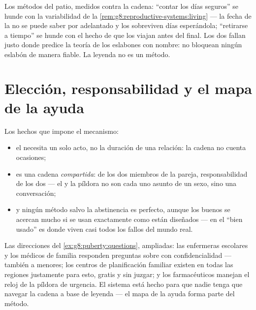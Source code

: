 \begin{remark}\label{rem:g8:contraception:notwork}
Los métodos del patio, medidos contra la cadena: ``contar los días
seguros'' se hunde con la variabilidad de la
\cref{rem:g8:reproductive-systems:living} --- la fecha de la 
no se puede saber por adelantado y los  sobreviven días
esperándola; ``retirarse a tiempo'' se hunde con el hecho de que los
 viajan antes del final. Los dos fallan justo donde
predice la teoría de los eslabones con nombre: no bloquean ningún
eslabón de manera fiable. La leyenda no es un método.
\end{remark}

\section{Elección, responsabilidad y el mapa de la ayuda}

\begin{proposition}\label{prop:g8:contraception:choice}
Los hechos que impone el mecanismo:
\begin{itemize}
  \item el  necesita un solo acto, no la duración de una
        relación: la cadena no cuenta ocasiones;
  \item es una cadena \emph{compartida}:  de los dos miembros de
        la pareja, responsabilidad de los dos --- el  y la
        píldora no son cada uno asunto de un sexo, sino una
        conversación;
  \item y ningún método salvo la abstinencia es perfecto, aunque los
        buenos se acercan mucho si se usan exactamente como están
        diseñados --- en el ``bien usado'' es donde viven casi todos
        los fallos del mundo real.
\end{itemize}
\end{proposition}
\admitted

\begin{example}\label{ex:g8:contraception:help}
Las direcciones del \cref{ex:g8:puberty:questions}, ampliadas: las
enfermeras escolares y los médicos de familia responden preguntas sobre
 con confidencialidad --- también a menores; los centros
de planificación familiar existen en todas las regiones justamente para
esto, gratis y sin juzgar; y los farmacéuticos manejan el reloj de la
píldora de urgencia. El sistema está hecho para que nadie tenga que
navegar la cadena a base de leyenda --- el mapa de la ayuda forma parte
del método.
\end{example}


